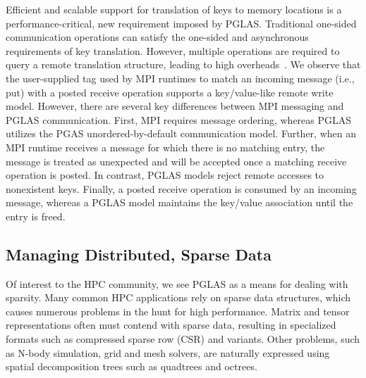 Efficient and scalable support for translation of keys to memory locations is a
performance-critical, new requirement imposed by PGLAS.  Traditional one-sided
communication operations can satisfy the one-sided and asynchronous
requirements of key translation.  However, multiple operations are required to
query a remote translation structure, leading to high overheads~\cite{namashivayam:15}.  We observe
that the user-supplied tag used by MPI runtimes to match an incoming message
(i.e., put) with a posted receive operation supports a key/value-like remote
write model.
However,
there are several key differences between MPI messaging and PGLAS
communication.  First, MPI requires message ordering, whereas PGLAS utilizes
the PGAS unordered-by-default communication model.  Further, when an MPI
runtime receives a message for which there is no matching entry, the message is
treated as unexpected and will be accepted once a matching receive operation is
posted.  In contrast, PGLAS models reject remote accesses to nonexistent keys.
Finally, a posted receive operation is consumed by an incoming message, whereas
a PGLAS model maintains the key/value association until the entry is freed.

%

\subsection{Managing Distributed, Sparse Data}

Of interest to the HPC community, we see PGLAS as a
means for dealing with sparsity. Many common HPC applications rely on
sparse data structures, which causes numerous problems in the hunt for
high performance. Matrix and tensor representations often must contend
with sparse data, resulting in specialized formats such as compressed
sparse row (CSR) and variants. Other problems, such as N-body
simulation, grid and mesh solvers, are naturally expressed using
spatial decomposition trees such as quadtrees and octrees. 

